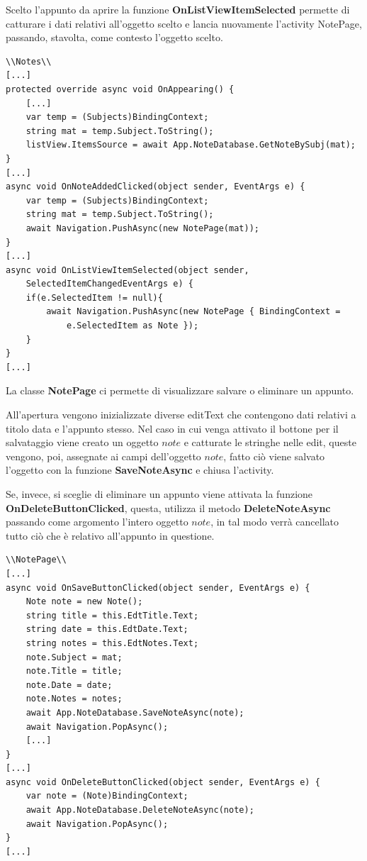 \documentclass[a4paper, 50pt, twoside]{article}
\begin{document}
Scelto l'appunto da aprire la funzione \textbf{OnListViewItemSelected} permette di catturare i dati relativi all'oggetto scelto e lancia nuovamente l'activity NotePage, passando, stavolta, come contesto l'oggetto scelto.

\begin{lstlisting}
\\Notes\\
[...]
protected override async void OnAppearing() {
	[...]
	var temp = (Subjects)BindingContext;
	string mat = temp.Subject.ToString();
	listView.ItemsSource = await App.NoteDatabase.GetNoteBySubj(mat);
}
[...]
async void OnNoteAddedClicked(object sender, EventArgs e) {
	var temp = (Subjects)BindingContext;
	string mat = temp.Subject.ToString();
	await Navigation.PushAsync(new NotePage(mat));
}
[...]
async void OnListViewItemSelected(object sender, 
	SelectedItemChangedEventArgs e) {
	if(e.SelectedItem != null){
		await Navigation.PushAsync(new NotePage { BindingContext =
			e.SelectedItem as Note });
	}
}
[...]
\end{lstlisting}

La classe \textbf{NotePage} ci permette di visualizzare salvare o eliminare un appunto.

All'apertura vengono inizializzate diverse editText che contengono dati relativi a titolo data e l'appunto stesso. Nel caso in cui venga attivato il bottone per il salvataggio viene creato un oggetto $note$ e catturate le stringhe nelle edit, queste vengono, poi, assegnate ai campi dell'oggetto $note$, fatto ciò viene salvato l'oggetto con la funzione \textbf{SaveNoteAsync} e chiusa l'activity.

Se, invece, si sceglie di eliminare un appunto viene attivata la funzione \textbf{OnDeleteButtonClicked}, questa, utilizza il metodo \textbf{DeleteNoteAsync} passando come argomento l'intero oggetto $note$, in tal modo verrà cancellato tutto ciò che è relativo all'appunto in questione.

\begin{lstlisting}
\\NotePage\\
[...]
async void OnSaveButtonClicked(object sender, EventArgs e) {
	Note note = new Note();
	string title = this.EdtTitle.Text;
	string date = this.EdtDate.Text;
	string notes = this.EdtNotes.Text;
	note.Subject = mat;
	note.Title = title;
	note.Date = date;
	note.Notes = notes;
	await App.NoteDatabase.SaveNoteAsync(note);
	await Navigation.PopAsync();
	[...]
}
[...]
async void OnDeleteButtonClicked(object sender, EventArgs e) {
	var note = (Note)BindingContext;
	await App.NoteDatabase.DeleteNoteAsync(note);
	await Navigation.PopAsync();
}
[...]
\end{lstlisting}
\end{document}
